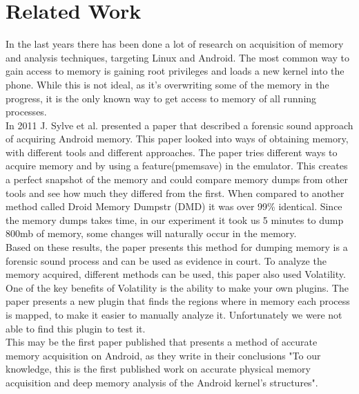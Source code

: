 \section{Related Work}
In the last years there has been done a lot of research on acquisition of memory
and analysis techniques, targeting Linux and Android. The most common way to 
gain access to memory is gaining root privileges and loads a new kernel into the 
phone. While this is not ideal, as it’s overwriting some of the memory in the 
progress, it is the only known way to get access to memory of all running processes.\\

In 2011 J. Sylve et al. presented a paper that described a forensic sound 
approach of acquiring Android memory. \cite{acq_vol_android_mem} This paper looked 
into ways of obtaining memory, with different tools and different approaches. The paper 
tries different ways to acquire memory and by using a feature(pmemsave) in the emulator. 
This creates a perfect snapshot of the memory and could compare memory dumps from other 
tools and see how much they differed from the first. When compared to another method 
called Droid Memory Dumpstr (DMD) it was over 99\% identical. Since the memory dumps 
takes time, in our experiment it took us 5 minutes to dump 800mb of memory, some 
changes will naturally occur in the memory.\\

Based on these results, the paper presents this method for dumping memory is a 
forensic sound process and can be used as evidence in court. To analyze the memory 
acquired, different methods can be used, this paper also used Volatility.
One of the key benefits of Volatility is the ability to make your 
own plugins. The paper presents a new plugin that finds the regions where in memory 
each process is mapped, to make it easier to manually analyze it. Unfortunately we were not 
able to find this plugin to test it.\\

This may be the first paper published that presents a method of accurate memory acquisition on
Android, as they write in their conclusions "To our knowledge, this is the first published work on
accurate physical memory acquisition and deep memory analysis of the Android kernel's structures".
